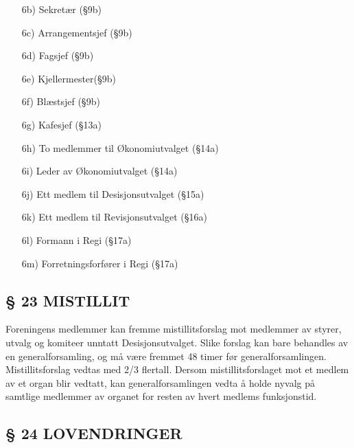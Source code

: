 \begin{itemize}
\begin{itemize}
\begin{itemize}
                \item[6b)] Sekretær (§9b) 

                \item[6c)] Arrangementsjef (§9b) 

                \item[6d)] Fagsjef (§9b) 

                \item[6e)] Kjellermester(§9b) 

                \item[6f)] Blæstsjef (§9b) 

                \item[6g)] Kafesjef (§13a) 

                \item[6h)] To medlemmer til Økonomiutvalget (§14a)

                \item[6i)] Leder av Økonomiutvalget (§14a) 

                \item[6j)] Ett medlem til Desisjonsutvalget (§15a) 

                \item[6k)] Ett medlem til Revisjonsutvalget (§16a) 

                \item[6l)] Formann i Regi (§17a) 

                \item[6m)] Forretningsforfører i Regi (§17a) 
                \end{itemize}
        \end{itemize}
\end{itemize}


\subsection*{§ 23 MISTILLIT}

Foreningens medlemmer kan fremme mistillitsforslag mot medlemmer av
styrer, utvalg og komiteer unntatt Desisjonsutvalget. Slike forslag
kan bare behandles av en generalforsamling, og må være fremmet 48
timer før generalforsamlingen. Mistillitsforslag vedtas med 2/3
flertall.  Dersom mistillitsforslaget mot et medlem av et organ blir
vedtatt, kan generalforsamlingen vedta å holde nyvalg på samtlige
medlemmer av organet for resten av hvert medlems funksjonstid.


\subsection*{§ 24 LOVENDRINGER}

